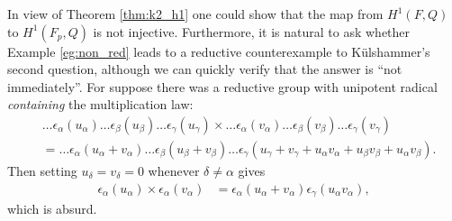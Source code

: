 In view of Theorem \ref{thm:k2_h1} one could show that the map from $H^1(F, Q)$ to $H^1(F_p, Q)$ is not injective. Furthermore, it is natural to ask whether Example \ref{eg:non_red} leads to a reductive counterexample to K\"ulshammer's second question, although we can quickly verify that the answer is ``not immediately''. For suppose there was a reductive group with unipotent radical \emph{containing} the multiplication law:
\begin{align*}
	&\ldots \epsilon_\alpha(u_\alpha) \ldots \epsilon_\beta(u_\beta) \ldots \epsilon_\gamma(u_\gamma) \times
	\ldots \epsilon_\alpha(v_\alpha) \ldots \epsilon_\beta(v_\beta) \ldots \epsilon_\gamma(v_\gamma)\\
	&=
	\ldots \epsilon_\alpha(u_\alpha + v_\alpha) \ldots \epsilon_\beta(u_\beta + v_\beta) \ldots \epsilon_\gamma(u_\gamma + v_\gamma + u_\alpha v_\alpha + u_\beta v_\beta + u_\alpha v_\beta).
\end{align*}
Then setting $u_\delta = v_\delta = 0$ whenever $\delta \neq \alpha$ gives
\begin{align*}
	\epsilon_\alpha(u_\alpha) \times \epsilon_\alpha(v_\alpha) &= \epsilon_\alpha(u_\alpha + v_\alpha) \epsilon_\gamma(u_\alpha v_\alpha),
\end{align*}
which is absurd.


